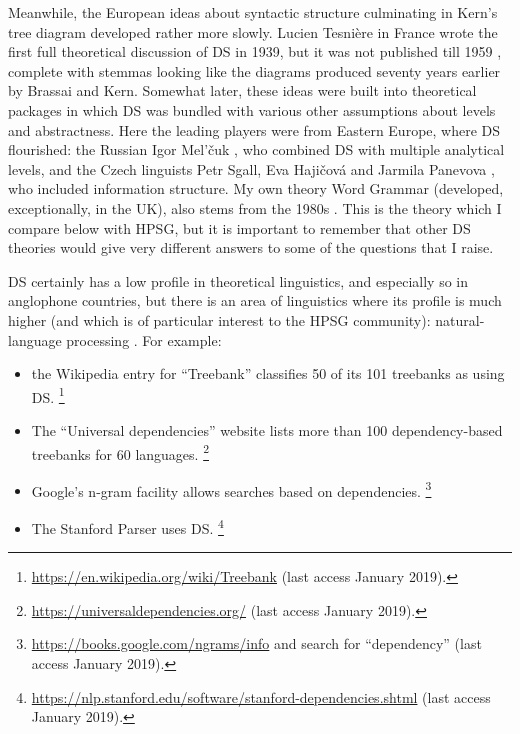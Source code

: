 \documentclass[output=paper
	        ,collection
	        ,collectionchapter
 	        ,biblatex
                ,babelshorthands
                ,newtxmath
                ,draftmode
                ,colorlinks, citecolor=brown
]{./langsci/langscibook}
\begin{document}
Meanwhile, the European ideas about syntactic structure culminating in Kern’s tree diagram developed rather more slowly. Lucien Tesnière in France wrote the first full theoretical discussion of DS in 1939, but it was not published till 1959 \citep{Tesniere59a-u,Tesniere2015a-u}, complete with stemmas looking like the diagrams produced seventy years earlier by Brassai and Kern. Somewhat later, these ideas were built into theoretical packages in which DS was bundled with various other assumptions about levels and abstractness. Here the leading players were from Eastern Europe, where DS flourished: the Russian Igor Mel’čuk \citep{Melcuk88a-u}, who combined DS with multiple analytical levels, and the Czech linguists Petr Sgall, Eva Hajičová and Jarmila Panevova \citep{Sgall&co1986}, who included information structure. My own theory Word Grammar (developed, exceptionally, in the UK), also stems from the 1980s \citep{Hudson84a-u,Hudson90a-u,Sugayama2002,Hudson2007a-u,Gisborne2008,Rosta2008,Gisborne2010,Hudson2010b-u,Gisborne2011,Duran-Eppler2011,TraugottTrousdale2013,Duran-Eppler&co2016,Hudson2016,Hudson2017,Hudson2018a,Gisborne2019}. This is the theory which I compare below with HPSG, but it is important to remember that other DS theories would give very different answers to some of the questions that I raise.

DS certainly has a low profile in theoretical linguistics, and especially so in anglophone countries, but there is an area of linguistics where its profile is much higher (and which is of particular interest to the HPSG community): natural-language processing \citep{KMcDN2009a-u}. For example:

\begin{itemize}
	\item the Wikipedia entry for ``Treebank'' classifies 50 of its 101 treebanks as using DS.%
	\footnote{\url{https://en.wikipedia.org/wiki/Treebank} (last access January 2019).}%
	
	
	\item The ``Universal dependencies'' website lists more than 100 dependency-based treebanks for 60 languages.%
	\footnote{\url{https://universaldependencies.org/} (last access January 2019).}%
	
	
	\item Google’s n-gram facility allows searches based on dependencies.%
	\footnote{\url{https://books.google.com/ngrams/info} and search for ``dependency'' (last access January 2019).}%
	
	
	\item The Stanford Parser \citep{ChenManning2014,deMarneffe&co2014} uses DS.%
	\footnote{\url{https://nlp.stanford.edu/software/stanford-dependencies.shtml} (last access January 2019).}%
	
\end{itemize}
\end{document}
